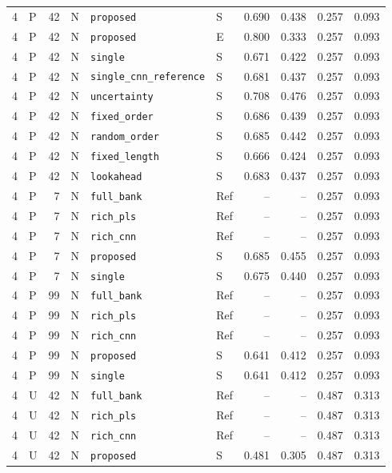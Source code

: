 \documentclass[10pt,a4paper]{article}
\begin{document}
\begin{landscape}
\begin{longtable}{rlrlllrrrr}
4 & P & 42 & N & \texttt{proposed} & S & 0.690 & 0.438 & 0.257 & 0.093 \\
4 & P & 42 & N & \texttt{proposed} & E & 0.800 & 0.333 & 0.257 & 0.093 \\
4 & P & 42 & N & \texttt{single} & S & 0.671 & 0.422 & 0.257 & 0.093 \\
4 & P & 42 & N & \texttt{single\_cnn\_reference} & S & 0.681 & 0.437 & 0.257 & 0.093 \\
4 & P & 42 & N & \texttt{uncertainty} & S & 0.708 & 0.476 & 0.257 & 0.093 \\
4 & P & 42 & N & \texttt{fixed\_order} & S & 0.686 & 0.439 & 0.257 & 0.093 \\
4 & P & 42 & N & \texttt{random\_order} & S & 0.685 & 0.442 & 0.257 & 0.093 \\
4 & P & 42 & N & \texttt{fixed\_length} & S & 0.666 & 0.424 & 0.257 & 0.093 \\
4 & P & 42 & N & \texttt{lookahead} & S & 0.683 & 0.437 & 0.257 & 0.093 \\
4 & P & 7 & N & \texttt{full\_bank} & Ref & -- & -- & 0.257 & 0.093 \\
4 & P & 7 & N & \texttt{rich\_pls} & Ref & -- & -- & 0.257 & 0.093 \\
4 & P & 7 & N & \texttt{rich\_cnn} & Ref & -- & -- & 0.257 & 0.093 \\
4 & P & 7 & N & \texttt{proposed} & S & 0.685 & 0.455 & 0.257 & 0.093 \\
4 & P & 7 & N & \texttt{single} & S & 0.675 & 0.440 & 0.257 & 0.093 \\
4 & P & 99 & N & \texttt{full\_bank} & Ref & -- & -- & 0.257 & 0.093 \\
4 & P & 99 & N & \texttt{rich\_pls} & Ref & -- & -- & 0.257 & 0.093 \\
4 & P & 99 & N & \texttt{rich\_cnn} & Ref & -- & -- & 0.257 & 0.093 \\
4 & P & 99 & N & \texttt{proposed} & S & 0.641 & 0.412 & 0.257 & 0.093 \\
4 & P & 99 & N & \texttt{single} & S & 0.641 & 0.412 & 0.257 & 0.093 \\
4 & U & 42 & N & \texttt{full\_bank} & Ref & -- & -- & 0.487 & 0.313 \\
4 & U & 42 & N & \texttt{rich\_pls} & Ref & -- & -- & 0.487 & 0.313 \\
4 & U & 42 & N & \texttt{rich\_cnn} & Ref & -- & -- & 0.487 & 0.313 \\
4 & U & 42 & N & \texttt{proposed} & S & 0.481 & 0.305 & 0.487 & 0.313 \\

\end{longtable}
\end{landscape}
\end{document}
